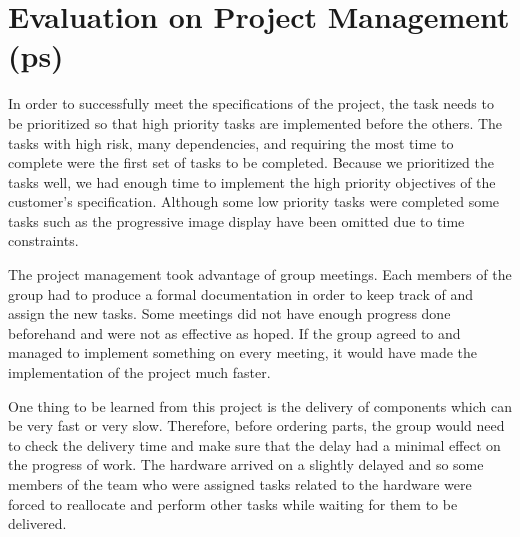 
\section{Evaluation on Project Management (ps)}

In order to successfully meet the specifications of the project, the task needs to be prioritized so that high priority tasks are implemented before the others.
The tasks with high risk, many dependencies, and requiring the most time to complete were the first set of tasks to be completed.
Because we prioritized the tasks well, we had enough time to implement the high priority objectives of the customer's specification.
Although some low priority tasks were completed some tasks such as the progressive image display have been omitted due to time constraints.

The project management took advantage of group meetings. Each members of the group had to produce a formal documentation in order to keep track of and assign the new tasks.
Some meetings did not have enough progress done beforehand and were not as effective as hoped.
If the group agreed to and managed to implement something on every meeting, it would have made the implementation of the project much faster. 

One thing to be learned from this project is the delivery of components which can be very fast or very slow. 
Therefore, before ordering parts, the group would need to check the delivery time and make sure that the delay had a minimal effect on the progress of work.
The hardware arrived on a slightly delayed and so some members of the team who were assigned tasks related to the hardware were forced to reallocate and perform other tasks while waiting for them to be delivered.
